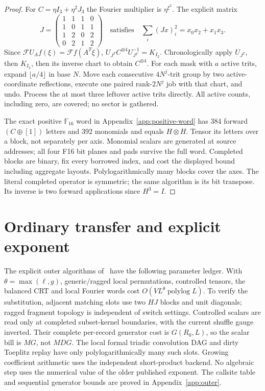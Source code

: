 \documentclass[11pt]{article}
\newcommand{\F}{\mathbb F}
\newcommand{\Oh}{O}
\begin{document}
\begin{proof}
For $C=\eta I_3+\eta^2J_3$ the Fourier multiplier is $\eta^{\xi^2}$.
The explicit matrix
\[J=\begin{pmatrix}1&1&1&0\\1&0&1&1\\1&2&0&2\\0&2&1&2\end{pmatrix}
\quad\text{satisfies}\quad\sum_i(Jx)_i^2=x_0x_2+x_1x_3.
\]
Since $\mathcal FU_Af(\xi)=\mathcal Ff(A^T\xi)$,
$U_{J^T}C^{\otimes4}U_{J^T}^{-1}=K_{I_2}$. Chronologically apply
$U_{J^T}$, then $K_{I_2}$, then its inverse chart to obtain $C^{\otimes4}$.
For each mask with $a$ active trits, expand $\lfloor a/4\rfloor$ in
base $N$. Move each consecutive $4N^j$-trit group by two active-coordinate
reflections, execute one paired rank-$2N^j$ job with that chart, and undo.
Process the at most three leftover active trits directly. All active
counts, including zero, are covered; no sector is gathered.

The exact positive $\F_{16}$ word in Appendix~\ref{app:positive-word}
has 384 forward $(C\oplus[1])$ letters and 392 monomials and equals
$H\otimes H$. Tensor its letters over a block, not separately per axis.
Monomial scalars are generated at source addresses; all four F16 bit
planes and pads survive the full word. Completed blocks are binary,
fix every borrowed index, and cost the displayed bound including
aggregate layouts. Polylogarithmically many blocks cover the axes.
The literal completed operator is symmetric; the same algorithm is its
bit transpose. Its inverse is two forward applications since $H^3=I$.
\end{proof}

\section{Ordinary transfer and explicit exponent}\label{sec:outer}
The explicit outer algorithms of~\cite{release} have the following
parameter ledger. With $\theta=\max(\ell,g)$, generic/ragged local
permutations, controlled tensors, the balanced CRT and local Fourier
words cost $\Oh(VL^\theta\operatorname{polylog}L)$. To verify the
substitution, adjacent matching slots use two $HJ$ blocks and unit
diagonals; ragged fragment topology is independent of switch settings.
Controlled scalars are read only at completed subset-kernel boundaries,
with the current shuffle gauge inverted. Their complete per-record
generator cost is $G(R_0,L)$, so the scalar bill is $MG$, not $MDG$.
The local formal triadic convolution DAG and dirty Toeplitz replay have
only polylogarithmically many such slots. Growing coefficient arithmetic
uses the independent short-product backend. No algebraic step uses
the numerical value of the older published exponent. The callsite table
and sequential generator bounds are proved in Appendix~\ref{app:outer}.
\end{document}
